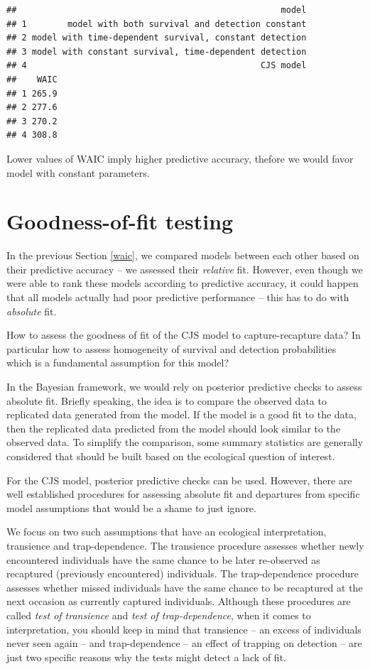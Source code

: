 \documentclass[
  12pt,
]{krantz}
\begin{document}
\begin{verbatim}
##                                                    model
## 1        model with both survival and detection constant
## 2 model with time-dependent survival, constant detection
## 3 model with constant survival, time-dependent detection
## 4                                              CJS model
##    WAIC
## 1 265.9
## 2 277.6
## 3 270.2
## 4 308.8
\end{verbatim}

Lower values of WAIC imply higher predictive accuracy, thefore we would favor model with constant parameters.

\hypertarget{goodness-of-fit-testing}{%
\section{Goodness-of-fit testing}\label{goodness-of-fit-testing}}

In the previous Section \ref{waic}, we compared models between each other based on their predictive accuracy -- we assessed their \emph{relative} fit. However, even though we were able to rank these models according to predictive accuracy, it could happen that all models actually had poor predictive performance -- this has to do with \emph{absolute} fit.

How to assess the goodness of fit of the CJS model to capture-recapture data? In particular how to assess homogeneity of survival and detection probabilities which is a fundamental assumption for this model?

In the Bayesian framework, we would rely on posterior predictive checks to assess absolute fit. Briefly speaking, the idea is to compare the observed data to replicated data generated from the model. If the model is a good fit to the data, then the replicated data predicted from the model should look similar to the observed data. To simplify the comparison, some summary statistics are generally considered that should be built based on the ecological question of interest.

For the CJS model, posterior predictive checks can be used. However, there are well established procedures for assessing absolute fit and departures from specific model assumptions that would be a shame to just ignore.

We focus on two such assumptions that have an ecological interpretation, transience and trap-dependence. The transience procedure assesses whether newly encountered individuals have the same chance to be later re-observed as recaptured (previously encountered) individuals. The trap-dependence procedure assesses whether missed individuals have the same chance to be recaptured at the next occasion as currently captured individuals. Although these procedures are called \emph{test of transience} and \emph{test of trap-dependence}, when it comes to interpretation, you should keep in mind that transience -- an excess of individuals never seen again -- and trap-dependence -- an effect of trapping on detection -- are just two specific reasons why the tests might detect a lack of fit.
\end{document}
